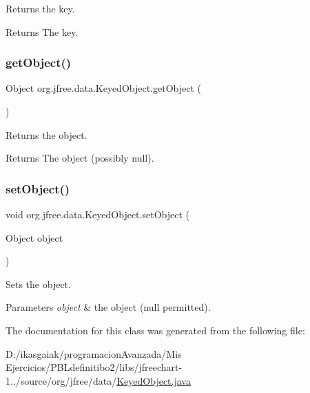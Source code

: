 Returns the key.

\begin{DoxyReturn}{Returns}
The key. 
\end{DoxyReturn}
\mbox{\label{classorg_1_1jfree_1_1data_1_1_keyed_object_a4d4505544f85146e208a7e9fc39750ec}} 
\subsubsection{\texorpdfstring{get\+Object()}{getObject()}}
{\footnotesize\ttfamily Object org.\+jfree.\+data.\+Keyed\+Object.\+get\+Object (\begin{DoxyParamCaption}{ }\end{DoxyParamCaption})}

Returns the object.

\begin{DoxyReturn}{Returns}
The object (possibly {\ttfamily null}). 
\end{DoxyReturn}
\mbox{\label{classorg_1_1jfree_1_1data_1_1_keyed_object_a55bed2accc2530ac9b5988a77301e8d6}} 
\subsubsection{\texorpdfstring{set\+Object()}{setObject()}}
{\footnotesize\ttfamily void org.\+jfree.\+data.\+Keyed\+Object.\+set\+Object (\begin{DoxyParamCaption}\item[{Object}]{object }\end{DoxyParamCaption})}

Sets the object.


\begin{DoxyParams}{Parameters}
{\em object} & the object ({\ttfamily null} permitted). \\
\hline
\end{DoxyParams}


The documentation for this class was generated from the following file\+:\begin{DoxyCompactItemize}
\item 
D\+:/ikasgaiak/programacion\+Avanzada/\+Mis Ejercicios/\+P\+B\+Ldefinitibo2/libs/jfreechart-\/1../source/org/jfree/data/\mbox{\hyperlink{_keyed_object_8java}{Keyed\+Object.\+java}}\end{DoxyCompactItemize}
